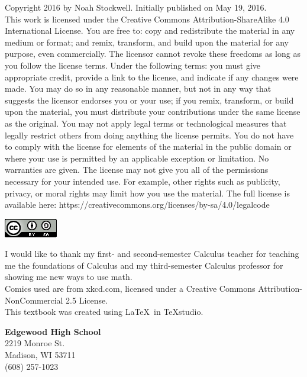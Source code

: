 \documentclass[../revisedmain.tex]{subfiles}
\begin{document}
	Copyright 2016 by Noah Stockwell. Initially published on May 19, 2016.\\ This work is licensed under the Creative Commons Attribution-ShareAlike 4.0 International License. You are free to: copy and redistribute the material in any medium or format; and remix, transform, and build upon the material for any purpose, even commercially. The licensor cannot revoke these freedoms as long as you follow the license terms. Under the following terms: you must give appropriate credit, provide a link to the license, and indicate if any changes were made. You may do so in any reasonable manner, but not in any way that suggests the licensor endorses you or your use; if you remix, transform, or build upon the material, you must distribute your contributions under the same license as the original. You may not apply legal terms or technological measures that legally restrict others from doing anything the license permits. You do not have to comply with the license for elements of the material in the public domain or where your use is permitted by an applicable exception or limitation. No warranties are given. The license may not give you all of the permissions necessary for your intended use. For example, other rights such as publicity, privacy, or moral rights may limit how you use the material. The full license is available here: https://creativecommons.org/licenses/by-sa/4.0/legalcode\\
	\begin{center}\includegraphics[width=.5in]{license}\end{center}\vfill I would like to thank my first- and second-semester Calculus teacher for teaching me the foundations of Calculus and my third-semester Calculus professor for showing me new ways to use math.\\\vfill
	Comics used are from xkcd.com, licensed under a Creative Commons Attribution-NonCommercial 2.5 License.\\
	\vspace{.25in}This textbook was created using \LaTeX\, in TeXstudio.\\
	\vspace{.25in}
	\begin{flushright}
	\textbf{Edgewood High School}\\
	2219 Monroe St.\\ Madison, WI 53711\\ (608) 257-1023
	\end{flushright}
\end{document}
